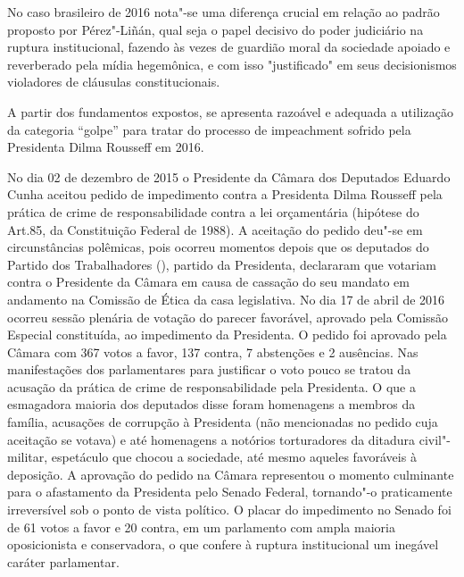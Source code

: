 No caso brasileiro de 2016 nota"-se uma diferença crucial em relação ao
padrão proposto por Pérez"-Liñán, qual seja o papel decisivo do poder
judiciário na ruptura institucional, fazendo às vezes de guardião moral
da sociedade apoiado e reverberado pela mídia hegemônica, e com isso
"justificado" em seus decisionismos violadores de cláusulas
constitucionais.

A partir dos fundamentos expostos, se apresenta razoável e adequada a
utilização da categoria ``golpe'' para tratar do processo de impeachment
sofrido pela Presidenta Dilma Rousseff em 2016.

No dia 02 de dezembro de 2015 o Presidente da Câmara dos Deputados
Eduardo Cunha aceitou pedido de impedimento contra a Presidenta Dilma
Rousseff pela prática de crime de responsabilidade contra a lei
orçamentária (hipótese do Art.85,  da Constituição Federal de 1988). A
aceitação do pedido deu"-se em circunstâncias polêmicas, pois ocorreu
momentos depois que os deputados do Partido dos Trabalhadores (),
partido da Presidenta, declararam que votariam contra o Presidente da
Câmara em causa de cassação do seu mandato em andamento na Comissão de
Ética da casa legislativa. No dia 17 de abril de 2016 ocorreu sessão
plenária de votação do parecer favorável, aprovado pela Comissão
Especial constituída, ao impedimento da Presidenta. O pedido foi
aprovado pela Câmara com 367 votos a favor, 137 contra, 7 abstenções e 2
ausências. Nas manifestações dos parlamentares para justificar o voto
pouco se tratou da acusação da prática de crime de responsabilidade pela
Presidenta. O que a esmagadora maioria dos deputados disse foram
homenagens a membros da família, acusações de corrupção à Presidenta
(não mencionadas no pedido cuja aceitação se votava) e até homenagens a
notórios torturadores da ditadura civil"-militar, espetáculo que chocou a
sociedade, até mesmo aqueles favoráveis à deposição. A
aprovação do pedido na Câmara representou o momento culminante para o
afastamento da Presidenta pelo Senado Federal, tornando"-o praticamente
irreversível sob o ponto de vista político. O placar do impedimento no
Senado foi de 61 votos a favor e 20 contra, em um parlamento com ampla
maioria oposicionista e conservadora, o que confere à ruptura
institucional um inegável caráter parlamentar.

